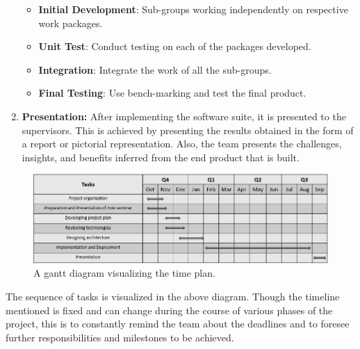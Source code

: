 \begin{enumerate}
		\begin{itemize}
		\item\textbf{Initial Development}: Sub-groups working independently on respective work packages.
		\item\textbf{Unit Test}: Conduct testing on each of the packages developed.
		\item\textbf{Integration}: Integrate the work of all the sub-groups.
		\item\textbf{Final Testing}: Use bench-marking and test the final product. 	
	\end{itemize}


	\item \textbf{Presentation:}
	After implementing the software suite, it is presented to the supervisors. This is achieved by presenting the results obtained in the form of a report or pictorial representation. Also, the team presents the challenges, insights, and benefits inferred from the end product that is built. 
	\end{enumerate}


\begin{figure}
	\centering
	\includegraphics[width=1.0\linewidth]{figures/timeplan}
	\caption{A gantt diagram visualizing the time plan.}
	\label{fig:timeplan}
\end{figure}

The sequence of tasks is visualized in the above diagram. Though the timeline mentioned is fixed and can change during the course of various phases of the project, this is to constantly remind the team about the deadlines and to foresee further responsibilities and milestones to be achieved. 


	